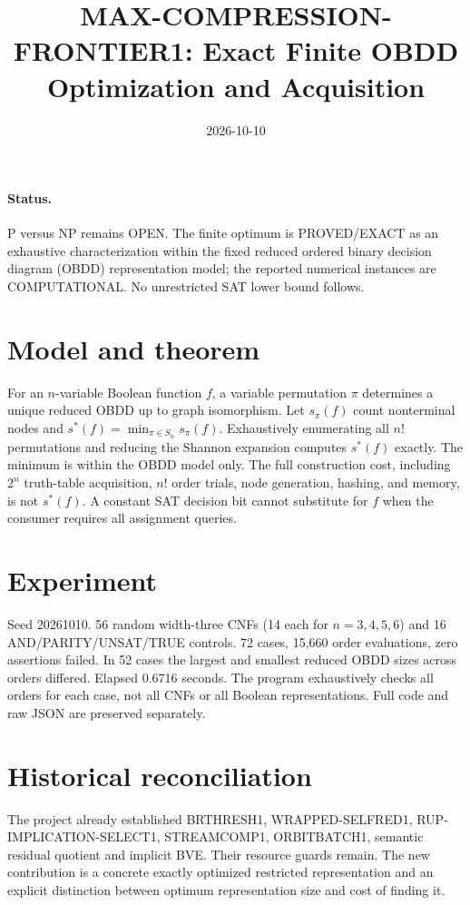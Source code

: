 \documentclass{article}
\begin{document}
\title{MAX-COMPRESSION-FRONTIER1: Exact Finite OBDD Optimization and Acquisition}
\date{2026-10-10}\maketitle
\paragraph{Status.} P versus NP remains OPEN. The finite optimum is PROVED/EXACT as an exhaustive characterization within the fixed reduced ordered binary decision diagram (OBDD) representation model; the reported numerical instances are COMPUTATIONAL. No unrestricted SAT lower bound follows.
\section*{Model and theorem}
For an $n$-variable Boolean function $f$, a variable permutation $\pi$ determines a unique reduced OBDD up to graph isomorphism. Let $s_\pi(f)$ count nonterminal nodes and $s^*(f)=\min_{\pi\in S_n}s_\pi(f)$. Exhaustively enumerating all $n!$ permutations and reducing the Shannon expansion computes $s^*(f)$ exactly. The minimum is within the OBDD model only. The full construction cost, including $2^n$ truth-table acquisition, $n!$ order trials, node generation, hashing, and memory, is not $s^*(f)$. A constant SAT decision bit cannot substitute for $f$ when the consumer requires all assignment queries.
\section*{Experiment}
Seed 20261010. 56 random width-three CNFs (14 each for $n=3,4,5,6$) and 16 AND/PARITY/UNSAT/TRUE controls. 72 cases, 15,660 order evaluations, zero assertions failed. In 52 cases the largest and smallest reduced OBDD sizes across orders differed. Elapsed 0.6716 seconds. The program exhaustively checks all orders for each case, not all CNFs or all Boolean representations. Full code and raw JSON are preserved separately.
\section*{Historical reconciliation}
The project already established BRTHRESH1, WRAPPED-SELFRED1, RUP-IMPLICATION-SELECT1, STREAMCOMP1, ORBITBATCH1, semantic residual quotient and implicit BVE. Their resource guards remain. The new contribution is a concrete exactly optimized restricted representation and an explicit distinction between optimum representation size and cost of finding it.
\end{document}
